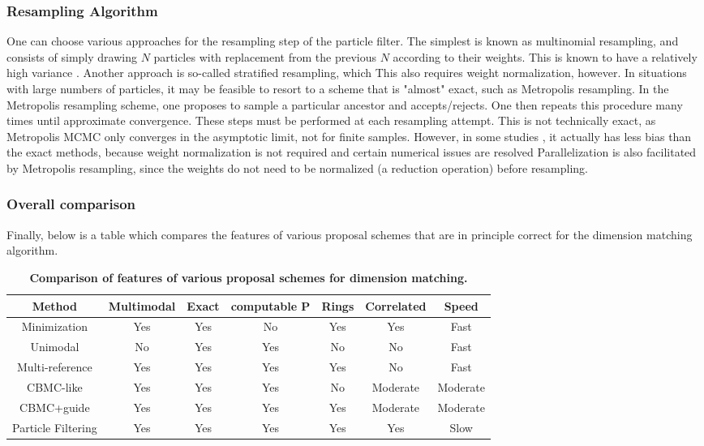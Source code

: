 \subsubsection{Resampling Algorithm}
One can choose various approaches for the resampling step of the particle filter. 
%
The simplest is known as multinomial resampling, and consists of simply drawing $N$ particles with replacement from the previous $N$ according to their weights.
%
This is known to have a relatively high variance \cite{Douc2005}.
%
Another approach is so-called stratified resampling, which 
%
This also requires weight normalization, however.
%
In situations with large numbers of particles, it may be feasible to resort to a scheme that is "almost" exact, such as Metropolis resampling. \cite{Murray2016}
%
In the Metropolis resampling scheme, one proposes to sample a particular ancestor and accepts/rejects.
%
One then repeats this procedure many times until approximate convergence.
%
These steps must be performed at each resampling attempt.
%
This is not technically exact, as Metropolis MCMC only converges in the asymptotic limit, not for finite samples.
%
However, in some studies \cite{Murray2016}, it actually has less bias than the exact methods, because weight normalization is not required and certain numerical issues are resolved
%
Parallelization is also facilitated by Metropolis resampling, since the weights do not need to be normalized (a reduction operation) before resampling.
%
\subsubsection{Overall comparison}
Finally, below is a table which compares the features of various proposal schemes that are in principle correct for the dimension matching algorithm.
%
\begin{table}
\caption{{\bf Comparison of features of various proposal schemes for dimension matching.}
\label{tab:proposal-scheme-comparison}
}
\begin{center}
    \footnotesize
    \begin{tabular}{||c | c | c | c | c | c | c||}
    \hline
         Method & Multimodal & Exact & computable P & Rings & Correlated & Speed \\
         \hline
         Minimization &  Yes & Yes & No & Yes & Yes & Fast \\
         Unimodal & No & Yes & Yes & No & No & Fast \\
         Multi-reference & Yes & Yes & Yes & Yes & No & Fast \\
         CBMC-like & Yes & Yes & Yes & No & Moderate & Moderate \\
         CBMC+guide & Yes & Yes & Yes & Yes & Moderate & Moderate\\
         Particle Filtering & Yes & Yes & Yes & Yes & Yes & Slow \\
         \hline
    \end{tabular}
\end{center}
\end{table}
%
%
